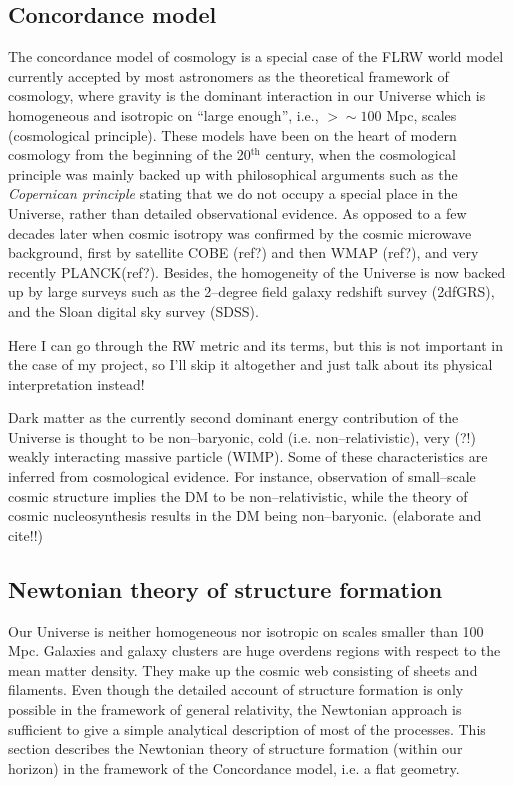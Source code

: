 \documentclass[paper=a4, fontsize=11pt]{scrartcl} %
\numberwithin{equation}{section} %
\numberwithin{figure}{section} %
\numberwithin{table}{section} %
\begin{document}
\subsection{Concordance model}
The concordance model of cosmology is a special case of the FLRW world model currently accepted by most astronomers as the theoretical framework of cosmology, where gravity is the dominant interaction in our Universe which is homogeneous and isotropic on ``large enough'', i.e., $>\sim 100$ Mpc,  scales (cosmological principle). These models have been on the heart of modern cosmology from the beginning of the 20$^\mathrm{th}$ century, when the cosmological principle was mainly backed up with philosophical arguments such as the \emph{Copernican principle} stating that we do not occupy a special place in the Universe, rather than detailed observational evidence. As opposed to a few decades later when cosmic isotropy was confirmed by the cosmic microwave background, first by satellite COBE (ref?) and then WMAP (ref?), and very recently PLANCK(ref?). Besides, the homogeneity of the Universe is now backed up by large surveys such as the 2--degree field galaxy redshift survey (2dfGRS), and the Sloan digital sky survey (SDSS).

Here I can go through the RW metric and its terms, but this is not important in the case of my project, so I'll skip it altogether and just talk about its physical interpretation instead!

Dark matter as the currently second dominant energy contribution of the Universe is thought to be non--baryonic, cold (i.e. non--relativistic), very (?!) weakly interacting massive particle (WIMP). Some of these characteristics are inferred from cosmological evidence. For instance, observation of small--scale cosmic structure implies the DM to be non--relativistic, while the theory of cosmic nucleosynthesis results in the DM being non--baryonic. (elaborate and cite!!)

\subsection{Newtonian theory of structure formation}
Our Universe is neither homogeneous nor isotropic on scales smaller than 100 Mpc. Galaxies and galaxy clusters are huge overdens regions with respect to the mean matter density. They make up the cosmic web consisting of sheets and filaments. Even though the detailed account of structure formation is only possible in the framework of general relativity, the Newtonian approach is sufficient to give a simple analytical description of most of the processes. This section describes the Newtonian theory of structure formation (within our horizon) in the framework of the Concordance model, i.e. a flat geometry.
\end{document}
